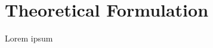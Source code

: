 \documentclass[../main.tex]{subfiles}
\begin{document}
\chapter{Theoretical Formulation}

Lorem ipsum
\end{document}
